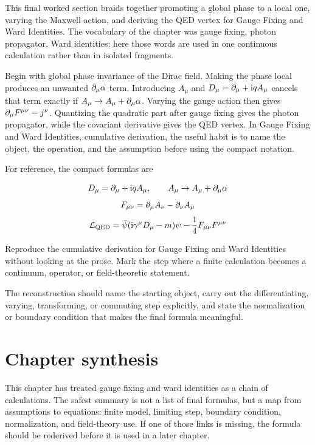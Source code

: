 This final worked section braids together promoting a global phase to a local one, varying the Maxwell action, and deriving the QED vertex for Gauge Fixing and Ward Identities.  The vocabulary of the chapter was gauge fixing, photon propagator, Ward identities; here those words are used in one continuous calculation rather than in isolated fragments.

Begin with global phase invariance of the Dirac field.  Making the phase local produces an unwanted \(\partial_\mu\alpha\) term.  Introducing \(A_\mu\) and \(D_\mu=\partial_\mu+\mathrm i qA_\mu\) cancels that term exactly if \(A_\mu\to A_\mu+\partial_\mu\alpha\).  Varying the gauge action then gives \(\partial_\mu F^{\mu\nu}=j^\nu\).  Quantizing the quadratic part after gauge fixing gives the photon propagator, while the covariant derivative gives the QED vertex.  In Gauge Fixing and Ward Identities, cumulative derivation, the useful habit is to name the object, the operation, and the assumption before using the compact notation.

For reference, the compact formulas are

\[
  D_\mu=\partial_\mu+\mathrm i qA_\mu,\qquad A_\mu\to A_\mu+\partial_\mu\alpha
\]
\[
  F_{\mu\nu}=\partial_\mu A_\nu-\partial_\nu A_\mu
\]
\[
  \mathcal L_{\mathrm{QED}}=\bar\psi(\mathrm i\gamma^\mu D_\mu-m)\psi-\frac14F_{\mu\nu}F^{\mu\nu}
\]

\begin{exercise}
Reproduce the cumulative derivation for Gauge Fixing and Ward Identities without looking at the prose.  Mark the step where a finite calculation becomes a continuum, operator, or field-theoretic statement.
\begin{answer}
The reconstruction should name the starting object, carry out the differentiating, varying, transforming, or commuting step explicitly, and state the normalization or boundary condition that makes the final formula meaningful.
\end{answer}
\end{exercise}



\section{Chapter synthesis}

This chapter has treated gauge fixing and ward identities as a chain of calculations.  The safest summary is not a list of final formulas, but a map from assumptions to equations: finite model, limiting step, boundary condition, normalization, and field-theory use.  If one of those links is missing, the formula should be rederived before it is used in a later chapter.


